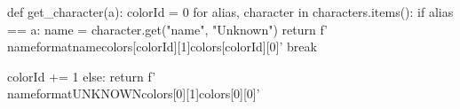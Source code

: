 
\newcommand{\characterLine}[3]{%
    \textbf{\postava{#1}} & \underline{\textit{#2}} & #3 \\ \\ %
}

\newcommand{\newpart}{%
    \noindent\makebox[\linewidth]{\rule{\maxdimen}{0.2pt}} \\[5mm]
}

\newcommand{\nameformat}[3]{%
    \textcolor[HTML]{#3}{\colorbox[HTML]{#2}{#1}}
}


\begin{pycode}
def get_character(a):
    colorId = 0
    for alias, character in characters.items():
        if alias == a:
            name = character.get("name", "Unknown")
            return f'\\nameformat{{{name}}}{{{colors[colorId][1]}}}{{{colors[colorId][0]}}}'
            break

        colorId += 1
    else:
        return f'\\nameformat{{UNKNOWN}}{{{colors[0][1]}}}{{{colors[0][0]}}}'
\end{pycode}

\newcommand{\postava}[1]{
    \pyc{%
    print(get_character("#1"))
    }
}